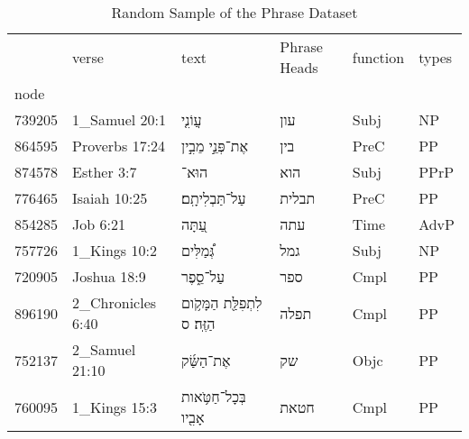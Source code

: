 \begin{table}[htbp!]
\centering
\caption{Random Sample of the Phrase Dataset}
\label{table:sampletable}
\begin{tabular}{llllll}
\toprule
{} &              verse &                                            text &        Phrase Heads & function & types \\
node   &                    &                                                 &                     &          &       \\
\midrule
739205 &      1\_Samuel 20:1 &                           \texthebrew{עֲוֹנִ֤י} &    \texthebrew{עון} &     Subj &    NP \\
864595 &     Proverbs 17:24 &                \texthebrew{אֶת־פְּנֵ֣י מֵבִ֣ין} &    \texthebrew{בין} &     PreC &    PP \\
874578 &         Esther 3:7 &                              \texthebrew{הוּא־} &    \texthebrew{הוא} &     Subj &  PPrP \\
776465 &       Isaiah 10:25 &                  \texthebrew{עַל־תַּבְלִיתָֽם׃} &  \texthebrew{תבלית} &     PreC &    PP \\
854285 &           Job 6:21 &                            \texthebrew{עַ֭תָּה} &    \texthebrew{עתה} &     Time &  AdvP \\
757726 &       1\_Kings 10:2 &                        \texthebrew{גְּ֠מַלִּים} &    \texthebrew{גמל} &     Subj &    NP \\
720905 &        Joshua 18:9 &                         \texthebrew{עַל־סֵ֑פֶר} &    \texthebrew{ספר} &     Cmpl &    PP \\
896190 &  2\_Chronicles 6:40 &  \texthebrew{לִתְפִלַּ֖ת הַמָּקֹ֥ום הַזֶּֽה׃ ס} &   \texthebrew{תפלה} &     Cmpl &    PP \\
752137 &     2\_Samuel 21:10 &                       \texthebrew{אֶת־הַשַּׂ֜ק} &     \texthebrew{שק} &     Objc &    PP \\
760095 &       1\_Kings 15:3 &           \texthebrew{בְּכָל־חַטֹּ֥אות אָבִ֖יו} &   \texthebrew{חטאת} &     Cmpl &    PP \\
\bottomrule
\end{tabular}
\end{table}
